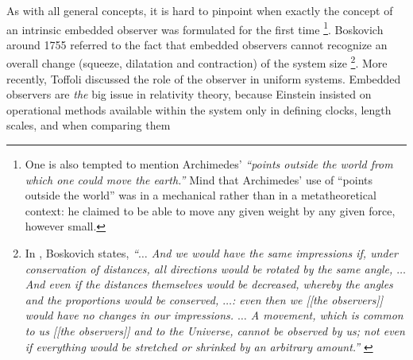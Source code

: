 \documentclass[pre,preprint,showpacs,showkeys,amsfonts]{revtex4}
\begin{document}
As with all general concepts, it is hard to pinpoint
when exactly the concept of an intrinsic embedded observer
was formulated for the first time
\footnote{
One is also tempted to mention
Archimedes' {\it ``points outside the world from which one could move the earth.''}
Mind that Archimedes' use of ``points outside the world''
was in a mechanical rather than in a metatheoretical context:
he claimed to be able to move any given weight by any given force, however small.
}.
Boskovich
\cite{bos} around 1755 referred to the fact that embedded
observers cannot recognize an overall change (squeeze, dilatation and contraction) of the system size
\footnote{
In \cite{bos}, Boskovich states,
{\it ``$\ldots$ And we would have the same impressions if,
under conservation of distances, all directions would be rotated by the same angle, $\ldots$
And even if the distances themselves would be decreased,
 whereby the angles and the proportions would be conserved, $\ldots$:
even then we [[the observers]] would have no changes in our impressions. $\ldots$
A movement, which is common to us [[the observers]] and to the Universe,
cannot be observed by us; not even if everything would be stretched or shrinked by an arbitrary amount.''
}
}.
More recently, Toffoli \cite{toffoli:79} discussed the role of the observer in uniform systems.
Embedded observers are {\em the} big issue in relativity
theory, because Einstein insisted on operational
methods available within the system only
in defining clocks, length scales,
and when comparing them
\end{document}
